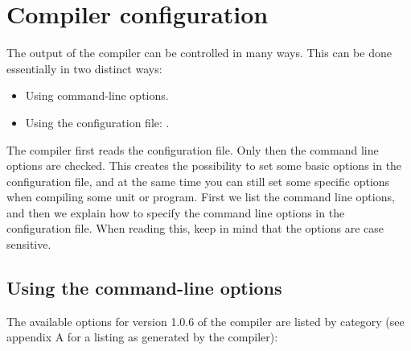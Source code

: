 \chapter{Compiler configuration}
\label{ch:CompilerConfiguration}

The output of the compiler can be controlled in many ways. This can be done
essentially in two distinct ways:
\begin{itemize}
\item Using command-line options.
\item Using the configuration file: .
\end{itemize}
The compiler first reads the configuration file. Only then the command line
options are checked. This creates the possibility to set some basic options
in the configuration file, and at the same time you can still set some
specific options when compiling some unit or program. First we list the
command line options, and then we explain how to specify the command
line options in the configuration file. When reading this, keep in mind
that the options are case sensitive. 


\section{Using the command-line options}

The available options for version 1.0.6 of the compiler are listed by
category (see appendix A for a listing as generated by the compiler):

%
%

